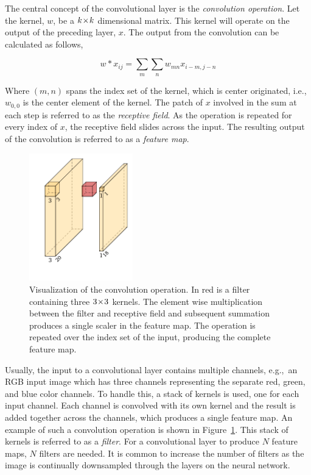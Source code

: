 The central concept of the convolutional layer is the \textit{convolution operation}.
Let the kernel, \(w\), be a \(k\!\times \! k\) dimensional matrix.
This kernel will operate on the output of the preceding layer, \(x\).
The output from the convolution can be calculated as follows,

\[w\ast x_{ij}=\sum_{m}\sum_{n}  w_{mn}x_{i-m,j-n}\]

Where \((m,n)\) spans the index set of the kernel, which is center originated, i.e., \(w_{0,0}\) is the center element of the kernel.
The patch of \(x\) involved in the sum at each step is referred to as the \textit{receptive field}.
As the operation is repeated for every index of \(x\), the receptive field slides across the input.
The resulting output of the convolution is referred to as a \textit{feature map}.

\begin{figure}[htb]
  \centering
  \includegraphics[width=0.4\textwidth]{figs/background/conv.pdf}
  \caption[Convolution operation]{Visualization of the convolution operation.
In red is a filter containing three \(3\!\times \! 3\) kernels.
The element wise multiplication between the filter and receptive field and subsequent summation produces a single scaler in the feature map.
The operation is repeated over the index set of the input, producing the complete feature map.}\label{fig:cnn}
\end{figure}

Usually, the input to a convolutional layer contains multiple channels, e.g.,\ an RGB input image which has three channels representing the separate red, green, and blue color channels.
To handle this, a stack of kernels is used, one for each input channel.
Each channel is convolved with its own kernel and the result is added together across the channels, which produces a single feature map.
An example of such a convolution operation is shown in Figure~\ref{fig:cnn}.
This stack of kernels is referred to as a \textit{filter}.
For a convolutional layer to produce \(N\) feature maps, \(N\) filters are needed.
It is common to increase the number of filters as the image is continually downsampled through the layers on the neural network.

